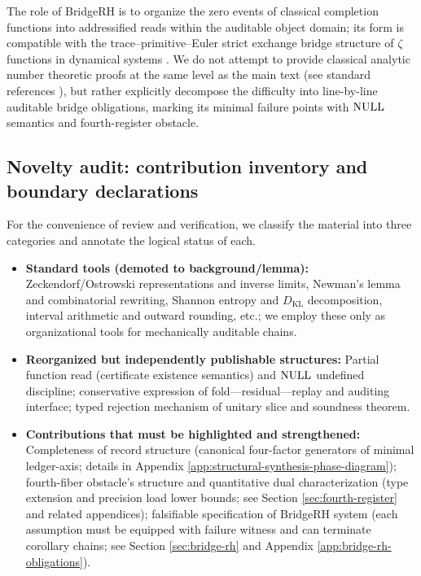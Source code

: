 The role of BridgeRH is to organize the zero events of classical completion functions into addressified reads within the auditable object domain; its form is compatible with the trace--primitive--Euler strict exchange bridge structure of $\zeta$ functions in dynamical systems \cite{Ruelle1976ZetaExpanding,Ruelle1978Thermodynamic,ParryPollicott1990Zeta}. We do not attempt to provide classical analytic number theoretic proofs at the same level as the main text (see standard references \cite{Apostol1976}), but rather explicitly decompose the difficulty into line-by-line auditable bridge obligations, marking its minimal failure points with $\mathrm{NULL}$ semantics and fourth-register obstacle.\par

\subsection{Novelty audit: contribution inventory and boundary declarations}
For the convenience of review and verification, we classify the material into three categories and annotate the logical status of each.\par
\begin{itemize}
  \item \textbf{Standard tools (demoted to background/lemma):} Zeckendorf/Ostrowski representations and inverse limits, Newman's lemma and combinatorial rewriting, Shannon entropy and $D_{\mathrm{KL}}$ decomposition, interval arithmetic and outward rounding, etc.; we employ these only as organizational tools for mechanically auditable chains.\par
  \item \textbf{Reorganized but independently publishable structures:} Partial function read (certificate existence semantics) and $\mathrm{NULL}$ undefined discipline; conservative expression of fold—residual—replay and auditing interface; typed rejection mechanism of unitary slice and soundness theorem.\par
  \item \textbf{Contributions that must be highlighted and strengthened:} Completeness of record structure (canonical four-factor generators of minimal ledger-axis; details in Appendix \ref{app:structural-synthesis-phase-diagram}); fourth-fiber obstacle's structure and quantitative dual characterization (type extension and precision load lower bounds; see Section \ref{sec:fourth-register} and related appendices); falsifiable specification of BridgeRH system (each assumption must be equipped with failure witness and can terminate corollary chains; see Section \ref{sec:bridge-rh} and Appendix \ref{app:bridge-rh-obligations}).\par
\end{itemize}

